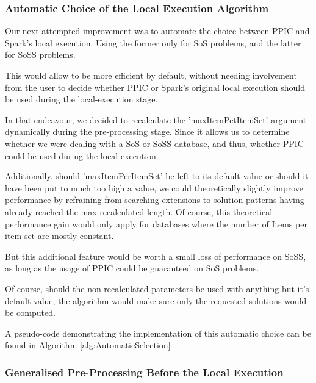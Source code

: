 \documentclass{eplmastersthesis}
\begin{document}
\subsubsection{Automatic Choice of the Local Execution Algorithm}

Our next attempted improvement was to automate the choice between PPIC and Spark's local execution. Using the former only for \acrlong{SoS} problems, and the latter for \acrlong{SoSS} problems. \newline

This would allow to be more efficient by default, without needing involvement from the user to decide whether PPIC or Spark's original local execution should be used during the local-execution stage. \newline

In that endeavour, we decided to recalculate the 'maxItemPetItemSet' argument dynamically during the pre-processing stage. Since it allows us to determine whether we were dealing with a \acrshort{SoS} or \acrshort{SoSS} database, and thus, whether PPIC could be used during the local execution. \newline

Additionally, should 'maxItemPerItemSet' be left to its default value or should it have been put to much too high a value, we could theoretically slightly improve performance by refraining from searching extensions to solution patterns having already reached the max recalculated length. Of course, this theoretical performance gain would only apply for databases where the number of Items per item-set are mostly constant.\newline

But this additional feature would be worth a small loss of performance on \acrshort{SoSS}, as long as the usage of PPIC could be guaranteed on \acrshort{SoS} problems. \newline

Of course, should the non-recalculated parameters be used with anything but it's default value, the algorithm would make sure only the requested solutions would be computed. \newline

A pseudo-code demonstrating the implementation of this automatic choice can be found in Algorithm \ref{alg:AutomaticSelection}

\subsubsection{Generalised Pre-Processing Before the Local Execution}
\end{document}
